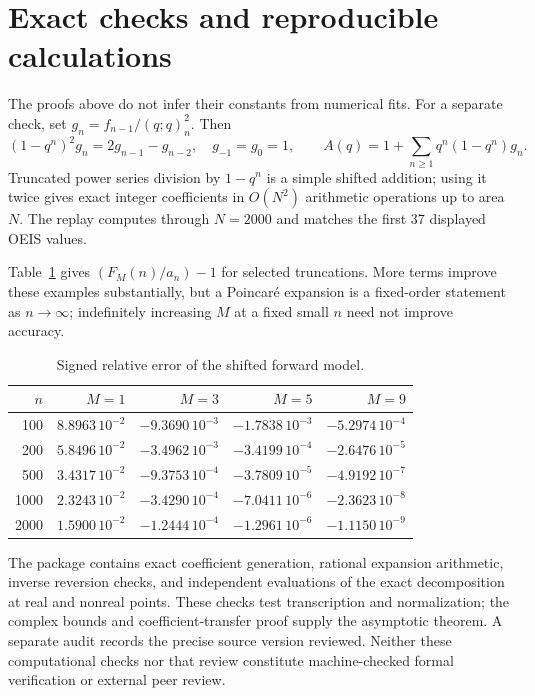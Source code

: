 \documentclass[11pt]{article}
\numberwithin{equation}{section}
\theoremstyle{definition}\newtheorem{definition}[theorem]{Definition}
\theoremstyle{remark}\newtheorem{remark}[theorem]{Remark}
\begin{document}
\section{Exact checks and reproducible calculations}\label{lcp:ao:sec:checks}
The proofs above do not infer their constants from numerical fits. For a separate check, set $g_n=f_{n-1}/(q;q)_n^2$. Then
\begin{equation}\label{lcp:ao:eq:compute}
(1-q^n)^2g_n=2g_{n-1}-g_{n-2},\quad g_{-1}=g_0=1,
\qquad A(q)=1+\sum_{n\ge1}q^n(1-q^n)g_n.
\end{equation}
Truncated power series division by $1-q^n$ is a simple shifted addition; using it twice gives exact integer coefficients in $O(N^2)$ arithmetic operations up to area $N$. The replay computes through $N=2000$ and matches the first 37 displayed OEIS values.

Table~\ref{lcp:ao:tab:errors} gives $(F_M(n)/a_n)-1$ for selected truncations. More terms improve these examples substantially, but a Poincar\'e expansion is a fixed-order statement as $n\to\infty$; indefinitely increasing $M$ at a fixed small $n$ need not improve accuracy.
\begin{table}[ht]
\centering\small
\begin{tabular}{r r r r r}
\toprule
$n$ & $M=1$ & $M=3$ & $M=5$ & $M=9$\\
\midrule
100  & $8.8963\,10^{-2}$ & $-9.3690\,10^{-3}$ & $-1.7838\,10^{-3}$ & $-5.2974\,10^{-4}$\\
200  & $5.8496\,10^{-2}$ & $-3.4962\,10^{-3}$ & $-3.4199\,10^{-4}$ & $-2.6476\,10^{-5}$\\
500  & $3.4317\,10^{-2}$ & $-9.3753\,10^{-4}$ & $-3.7809\,10^{-5}$ & $-4.9192\,10^{-7}$\\
1000 & $2.3243\,10^{-2}$ & $-3.4290\,10^{-4}$ & $-7.0411\,10^{-6}$ & $-2.3623\,10^{-8}$\\
2000 & $1.5900\,10^{-2}$ & $-1.2444\,10^{-4}$ & $-1.2961\,10^{-6}$ & $-1.1150\,10^{-9}$\\
\bottomrule
\end{tabular}
\caption{Signed relative error of the shifted forward model.}\label{lcp:ao:tab:errors}
\end{table}
The package contains exact coefficient generation, rational expansion arithmetic, inverse reversion checks, and independent evaluations of the exact decomposition at real and nonreal points. These checks test transcription and normalization; the complex bounds and coefficient-transfer proof supply the asymptotic theorem. A separate audit records the precise source version reviewed. Neither these computational checks nor that review constitute machine-checked formal verification or external peer review.
\end{document}
